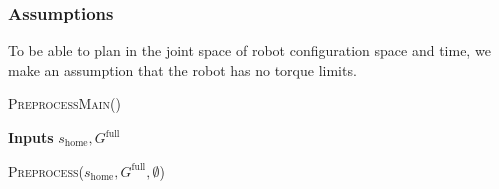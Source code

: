 \subsubsection{Assumptions}
To be able to plan in the joint space of robot configuration space and time, we make an assumption that the robot has no torque limits.
\begin{algorithm}
\caption{\textsc{PreprocessMain()}}\label{alg:1}
\hspace*{\algorithmicindent} \textbf{Inputs} $s_{\textrm{home}}, G^{\textrm{full}}$ \\
\begin{algorithmic}[1]
\State \textsc{Preprocess}($s_{\textrm{home}},G^{\textrm{full}},\emptyset$)
\end{algorithmic}
\end{algorithm}

